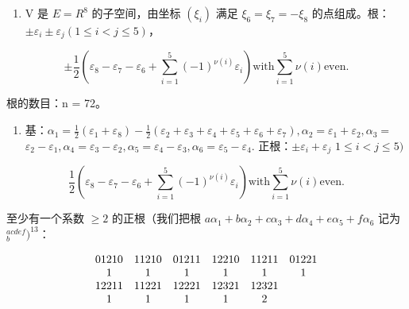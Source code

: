 
\begin{enumerate}
\def\labelenumi{(\Roman{enumi})}
\tightlist
\item
  V 是 \(E = R^{8}\) 的子空间，由坐标 \((\xi_{i})\) 满足 \(\xi_{6} = \xi_{7} = -\xi_{8}\) 的点组成。根：\(\pm\varepsilon_{i} \pm \varepsilon_{j} (1 \leqslant i < j \leqslant 5)\)，
\end{enumerate}

\[
\pm \frac {1}{2} (\varepsilon_ {8} - \varepsilon_ {7} - \varepsilon_ {6} + \sum_ {i = 1} ^ {5} (- 1) ^ {\nu (i)} \varepsilon_ {i}) \text {with} \sum_ {i = 1} ^ {5} \nu (i) \text {even.}
\]

根的数目：n = 72。

\begin{enumerate}
\def\labelenumi{(\Roman{enumi})}
\setcounter{enumi}{1}
\tightlist
\item
  基：\(\alpha_{1} = \frac{1}{2} (\varepsilon_{1} + \varepsilon_{8}) - \frac{1}{2} (\varepsilon_{2} + \varepsilon_{3} + \varepsilon_{4} + \varepsilon_{5} + \varepsilon_{6} + \varepsilon_{7}),\alpha_{2} = \varepsilon_{1} + \varepsilon_{2},\alpha_{3} =\) \(\varepsilon_2 - \varepsilon_1,\alpha_4 = \varepsilon_3 - \varepsilon_2,\alpha_5 = \varepsilon_4 - \varepsilon_3,\alpha_6 = \varepsilon_5 - \varepsilon_4.\) 正根：\(\pm \varepsilon_i + \varepsilon_j\) \(1\leqslant i <   j\leqslant 5)\)
\end{enumerate}

\[
\frac {1}{2} \left(\varepsilon_ {8} - \varepsilon_ {7} - \varepsilon_ {6} + \sum_ {i = 1} ^ {5} (- 1) ^ {\nu (i)} \varepsilon_ {i}\right) \text {with} \sum_ {i = 1} ^ {5} \nu (i) \text {even}.
\]

至少有一个系数 \(\geqslant 2\) 的正根（我们把根 \(a\alpha_{1} + b\alpha_{2} + c\alpha_{3} + d\alpha_{4} + e\alpha_{5} + f\alpha_{6}\) 记为 \({ }^{a c d e f}_{b})^{13}\)：

\[
\begin{array}{c c c c c c} 0   1   2   1   0 & 1   1   2   1   0 & 0   1   2   1   1 & 1   2   2   1   0 & 1   1   2   1   1 & 0   1   2   2   1 \\ 1 & 1 & 1 & 1 & 1 & 1 \\ 1   2   2   1   1 & 1   1   2   2   1 & 1   2   2   2   1 & 1   2   3   2   1 & 1   2   3   2   1 \\ 1 & 1 & 1 & 1 & 2 \end{array}
\]

